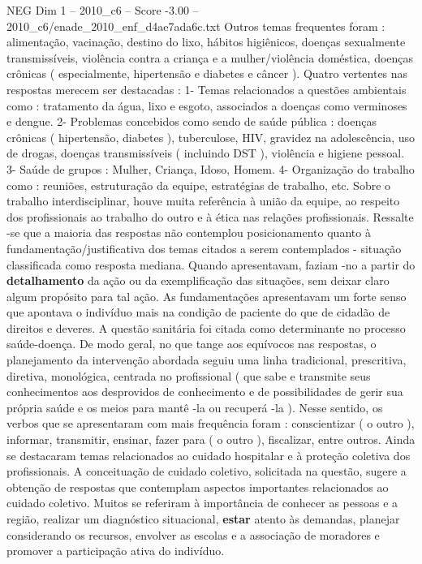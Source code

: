 \begin{textsample}{NEG Dim 1 – 2010\_c6 – Score -3.00 – 2010\_c6/enade\_2010\_enf\_d4ae7ada6c.txt}
Outros temas frequentes foram : alimentação, vacinação, destino do lixo, hábitos higiênicos, doenças sexualmente transmissíveis, violência contra a criança e a mulher/violência doméstica, doenças crônicas ( especialmente, hipertensão e diabetes e câncer ).
Quatro vertentes nas respostas merecem ser destacadas : 1- Temas relacionados a questões ambientais como : tratamento da água, lixo e esgoto, associados a doenças como verminoses e dengue. 2- Problemas concebidos como sendo de saúde pública : doenças crônicas ( hipertensão, diabetes ), tuberculose, HIV, gravidez na adolescência, uso de drogas, doenças transmissíveis ( incluindo DST ), violência e higiene pessoal. 3- Saúde de grupos : Mulher, Criança, Idoso, Homem. 4- Organização do trabalho como : reuniões, estruturação da equipe, estratégias de trabalho, etc.
Sobre o trabalho interdisciplinar, houve muita referência à união da equipe, ao respeito dos profissionais ao trabalho do outro e à ética nas relações profissionais.
Ressalte -se que a maioria das respostas não contemplou posicionamento quanto à fundamentação/justificativa dos temas citados a serem contemplados - situação classificada como resposta mediana.
Quando apresentavam, faziam -no a partir do \textbf{detalhamento} da ação ou da exemplificação das situações, sem deixar claro algum propósito para tal ação.
As fundamentações apresentavam um forte senso que apontava o indivíduo mais na condição de paciente do que de cidadão de direitos e deveres.
A questão sanitária foi citada como determinante no processo saúde-doença.
De modo geral, no que tange aos equívocos nas respostas, o planejamento da intervenção abordada seguiu uma linha tradicional, prescritiva, diretiva, monológica, centrada no profissional ( que sabe e transmite seus conhecimentos aos desprovidos de conhecimento e de possibilidades de gerir sua própria saúde e os meios para mantê -la ou recuperá -la ).
Nesse sentido, os verbos que se apresentaram com mais frequência foram : conscientizar ( o outro ), informar, transmitir, ensinar, fazer para ( o outro ), fiscalizar, entre outros.
Ainda se destacaram temas relacionados ao cuidado hospitalar e à proteção coletiva dos profissionais.
A conceituação de cuidado coletivo, solicitada na questão, sugere a obtenção de respostas que contemplam aspectos importantes relacionados ao cuidado coletivo.
Muitos se referiram à importância de conhecer as pessoas e a região, realizar um diagnóstico situacional, \textbf{estar} atento às demandas, planejar considerando os recursos, envolver as escolas e a associação de moradores e promover a participação ativa do indivíduo.

\end{textsample}
